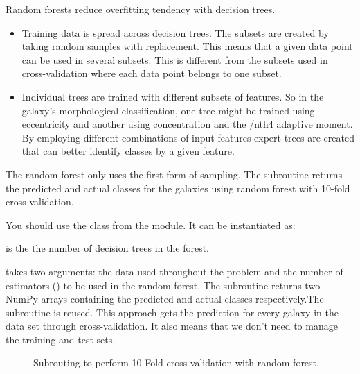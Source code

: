 Random forests reduce overfitting tendency with decision trees.

\begin{itemize}
	\item Training data is spread across decision trees. The subsets are created by taking random samples with replacement. This means that a given data point can be used in several subsets. This is different from the subsets used in cross-validation where each data point belongs to one subset.
	
	\item Individual trees are trained with different subsets of features. So in the galaxy's morphological classification, one tree might be trained using eccentricity and another using concentration and the /nth{4} adaptive moment. By employing different combinations of input features expert trees are created that can better identify classes by a given feature.
\end{itemize}

The  random forest only uses the first form of sampling. The  subroutine returns the predicted and actual classes for the galaxies using random forest with 10-fold  cross-validation.

You should use the  class from the  module. It can be instantiated as:\\


 is the the number of decision trees in the forest.

 takes two arguments: the data used throughout the problem and the number of estimators () to be used in the random forest. The subroutine returns two NumPy arrays containing the predicted and actual classes respectively.The  subroutine is reused.
This approach gets the prediction for every galaxy in the data set through cross-validation. It also means that we don't need to manage the training and test sets.
\begin{figure}[H]
	\centering       {}
	\caption{Subrouting to perform 10-Fold cross validation with random forest.}
	\label{fig:rfk}
\end{figure}

